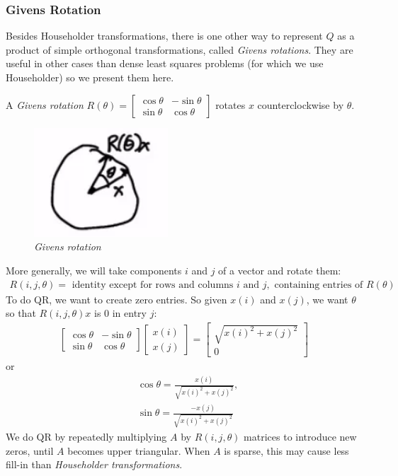 \documentclass[11pt]{article}
\numberwithin{equation}{section}
\begin{document}
\subsubsection{Givens Rotation}
Besides Householder transformations, there is one other way to represent $Q$ as a product of simple orthogonal transformations, called \textit{Givens rotations}. 
They are useful in other cases than dense least squares problems (for which we use Householder) so we present them here.

A \textit{Givens rotation} $R(\theta)=\left[\begin{array}{cc}
    \cos \theta & -\sin \theta \\
    \sin \theta & \cos \theta
    \end{array}\right]$
rotates $x$ counterclockwise by $\theta$.

\begin{figure}[h]
    \centering
    \includegraphics[width=5cm]{images/lec7-2.png}
    \caption{\textit{Givens rotation}}
\end{figure}

More generally, we will take components $i$ and $j$ of a vector and rotate them: \begin{align*}
    R(i,j,\theta) = \text{ identity except for rows and columns } i \text{ and } j, \text{ containing entries of }R(\theta)
\end{align*}
To do QR, we want to create zero entries. So given $x(i)$ and $x(j)$, we want $\theta$ so that $R(i,j,\theta)x$ is 0 in entry $j$: \begin{align*}
    \left[\begin{array}{cc}
        \cos \theta & -\sin \theta \\
        \sin \theta & \cos \theta
        \end{array}\right]\left[\begin{array}{l}
        x(i) \\
        x(j)
        \end{array}\right]=\left[\begin{array}{c}
        \sqrt{x(i)^{2}+x(j)^{2}} \\
        0
        \end{array}\right]
\end{align*}
or \begin{align*}
    &\cos \theta=\frac{x(i)}{\sqrt{x(i)^{2}+x(j)^{2}}}, \\
    &\sin \theta=\frac{-x(j)}{\sqrt{x(i)^{2}+x(j)^{2}}}
\end{align*}
We do QR by repeatedly multiplying $A$ by $R(i,j,\theta)$ matrices to introduce new zeros, until $A$ becomes upper triangular.
When $A$ is sparse, this may cause less fill-in than \textit{Householder transformations}.
\end{document}
